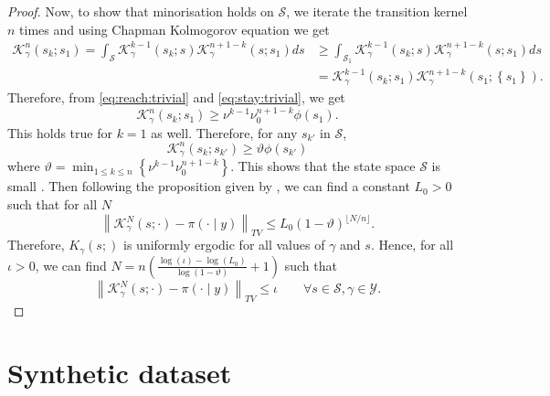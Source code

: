 \documentclass[
12pt]{article}
\begin{document}
\begin{proof}
		Now, to show that minorisation holds on $\mathcal{S}$, we iterate the transition kernel $n$ times and using Chapman Kolmogorov equation we get
		\begin{align*}
			\mathcal{K}_{\gamma}^n\left(s_k;s_1\right)
			= \int_{\mathcal{S}}\mathcal{K}_{\gamma}^{k-1}\left(s_k;s\right)\mathcal{K}_{\gamma}^{n+1-k}\left(s;s_1\right)ds
			& \ge \int_{\mathcal{S}_1}\mathcal{K}_{\gamma}^{k-1}\left(s_k;s\right)\mathcal{K}_{\gamma}^{n+1-k}\left(s;s_1\right)ds\\
			& = \mathcal{K}_{\gamma}^{k-1}\left(s_k;s_1\right)\mathcal{K}_{\gamma}^{n+1-k}\left(s_1;\left\{s_1\right\}\right).
		\end{align*}
		Therefore, from \cref{eq:reach:trivial} and \cref{eq:stay:trivial}, we get 
		\begin{equation*}
			\mathcal{K}_{\gamma}^n\left(s_k;s_1\right) \ge \nu^{k-1} \nu_0^{n+1-k}\phi\left(s_1\right).
		\end{equation*}
		This holds true for $k=1$ as well. Therefore, for any $s_{k'}$ in $\mathcal{S}$,  
		\begin{equation*}
			\mathcal{K}_{\gamma}^n\left(s_k;s_{k'}\right) \ge \vartheta\phi\left(s_{k'}\right)
		\end{equation*}
		where $\vartheta = \min_{1\le k\le n}\left\{\nu^{k-1} \nu_0^{n+1-k}\right\}$. This shows that the state space $\mathcal{S}$ is small \citep{meyn_tweedie1994}. Then following the proposition given by \citet{Tierney1994}, we can find a constant $L_0>0$ such that for all $N$
		\begin{equation}
			\left\|\mathcal{K}^N_{\gamma}(s;\cdot) - \pi(\cdot\mid y)\right\|_{TV} \le L_0 (1-\vartheta)^{\lfloor N/n\rfloor}.
		\end{equation}
		Therefore, $K_{\gamma}(s;)$ is uniformly ergodic for all values of $\gamma$ and $s$. Hence, for all $\iota>0$, we can find $N = n\left(\frac{\log(\iota)-\log(L_0)}{\log(1-\vartheta)} +1\right)$ such that
		\begin{equation}
			\left\|\mathcal{K}^N_{\gamma}(s;\cdot) - \pi(\cdot\mid y)\right\|_{TV} \le \iota \qquad\forall s\in \mathcal{S}, \gamma\in\mathcal{Y}.
		\end{equation}
		
	\end{proof}
	
	\section{Synthetic dataset}\label{app:results}
	
\end{document}
